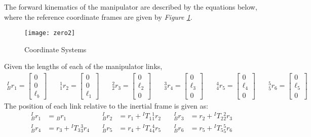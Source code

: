 The forward kinematics of the manipulator are described by the equations below, where the reference coordinate frames are given by \emph{Figure \ref{fig:coords}}.
\begin{figure}[htp]
  \centering
  \texttt{[image: zero2]}
  \caption{Coordinate Systems}
  \label{fig:coords}
\end{figure}

Given the lengths of each of the manipulator links,
\[
\begin{aligned}
  ^I_Br_1 = \begin{bmatrix} 0\\0\\ \ell_b\end{bmatrix} & \quad
  ^1_1r_2 = \begin{bmatrix} 0\\0\\ \ell_1\end{bmatrix} & \quad
  ^2_2r_3 = \begin{bmatrix} 0\\\ell_2\\ 0\end{bmatrix} & \quad
  ^3_3r_4 = \begin{bmatrix} 0\\\ell_3\\ 0\end{bmatrix} & \quad
  ^4_4r_5 = \begin{bmatrix} 0\\\ell_4\\ 0\end{bmatrix} & \quad
  ^5_5r_6 = \begin{bmatrix} 0\\\ell_5\\ 0\end{bmatrix} & \quad
\end{aligned}
\]
The position of each link relative to the inertial frame is given as:
\[
\begin{aligned}
^I_Br_1 &= {}_Br_1 &\quad
^I_Br_2 &= r_1 + {}^IT_1 {}^1_1r_2 &\quad
^I_Br_3 &= r_2 + {}^IT_2 {}^2_2r_3 \\
^I_Br_4 &= r_3 + {}^IT_3 {}^3_3r_4 &\quad
^I_Br_5 &= r_4 + {}^IT_4 {}^4_4r_5 &\quad
^I_Br_6 &= r_5 + {}^IT_5 {}^5_5r_6
\end{aligned}
\]

